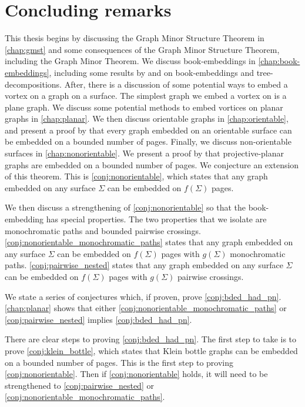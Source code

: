 \chapter{Concluding remarks}\label{chap:Future Work}

This thesis begins by discussing the Graph Minor Structure Theorem in \cref{chap:gmst} and some consequences of the Graph Minor Structure Theorem, including the Graph Minor Theorem. We discuss book-embeddings in \cref{chap:book-embeddings}, including some results by \textcite{ganleyPagenumberTrees2001} and \textcite{hickingbothamStackNumberCliqueSum2023} on book-embeddings and tree-decompositions. After, there is a discussion of some potential ways to embed a vortex on a graph on a surface. The simplest graph we embed a vortex on is a plane graph. We discuss some potential methods to embed vortices on planar graphs in \cref{chap:planar}. We then discuss orientable graphs in \cref{chap:orientable}, and present a proof by \textcite{heathPagenumberGenusGraphs1992} that every graph embedded on an orientable surface can be embedded on a bounded number of pages. Finally, we discuss non-orientable surfaces in \cref{chap:nonorientable}. We present a proof by \textcite{nakamotoBookEmbeddingProjectiveplanar2015} that projective-planar graphs are embedded on a bounded number of pages. We conjecture an extension of this theorem. This is \cref{conj:nonorientable}, which states that any graph embedded on any surface $\Sigma$ can be embedded on $f(\Sigma)$ pages. 

We then discuss a strengthening of \cref{conj:nonorientable} so that the book-embedding has special properties. The two properties that we isolate are monochromatic paths and bounded pairwise crossings. \cref{conj:nonorientable_monochromatic_paths} states that any graph embedded on any surface $\Sigma$ can be embedded on $f(\Sigma)$ pages with $g(\Sigma)$ monochromatic paths. \cref{conj:pairwise_nested} states that any graph embedded on any surface $\Sigma$ can be embedded on $f(\Sigma)$ pages with $g(\Sigma)$ pairwise crossings. 

We state a series of conjectures which, if proven, prove \cref{conj:bded_had_pn}. \cref{chap:planar} shows that either \cref{conj:nonorientable_monochromatic_paths} or \cref{conj:pairwise_nested} implies \cref{conj:bded_had_pn}.

There are clear steps to proving \cref{conj:bded_had_pn}. The first step to take is to prove \cref{conj:klein_bottle}, which states that Klein bottle graphs can be embedded on a bounded number of pages. This is the first step to proving \cref{conj:nonorientable}. Then if \cref{conj:nonorientable} holds, it will need to be strengthened to \cref{conj:pairwise_nested} or \cref{conj:nonorientable_monochromatic_paths}. 